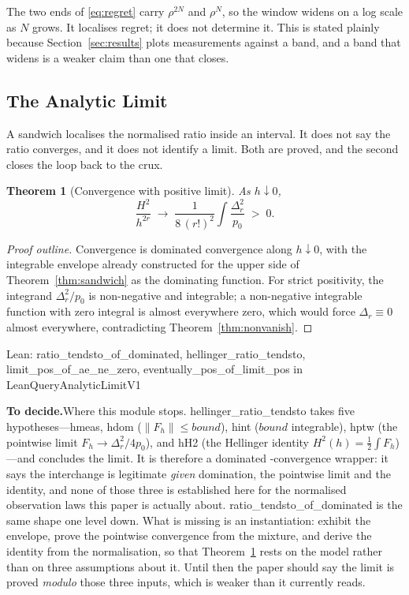\documentclass[conference]{IEEEtran}
\newtheorem{theorem}{Theorem}
\theoremstyle{definition}
\newcommand{\lean}[1]{\textsf{\footnotesize #1}}
\newcommand{\leanbox}[1]{%
  \par\vspace{2pt}\noindent
  {\footnotesize\textsf{Lean: #1}}\par\vspace{2pt}}
\newif\ifshownotes\shownotestrue
\newcommand{\TODOPAR}[1]{\ifshownotes\par\vspace{2pt}\noindent%
  {\color{todocol}\textsf{\footnotesize\textbf{To decide.}\;#1}}\par\vspace{2pt}\fi}
\begin{document}
The two ends of \eqref{eq:regret} carry $\rho^{2N}$ and $\rho^{N}$, so the window widens on a
log scale as $N$ grows. It localises regret; it does not determine it. This is stated plainly
because Section~\ref{sec:results} plots measurements against a band, and a band that widens
is a weaker claim than one that closes.

\subsection{The Analytic Limit}
\label{sec:limit}

A sandwich localises the normalised ratio inside an interval. It does not say the ratio
converges, and it does not identify a limit. Both are proved, and the second closes the loop
back to the crux.

\begin{theorem}[Convergence with positive limit]
\label{thm:limit}
As $h\downarrow0$,
\begin{equation}
\frac{H^{2}}{h^{2r}}\;\longrightarrow\;\frac{1}{8\,(r!)^{2}}\int\frac{\Delta_{r}^{2}}{p_{0}}
\;>\;0 .
\label{eq:limit}
\end{equation}
\end{theorem}

\begin{proof}[Proof outline]
Convergence is dominated convergence along $h\downarrow0$, with the integrable envelope
already constructed for the upper side of Theorem~\ref{thm:sandwich} as the dominating
function. For strict positivity, the integrand $\Delta_{r}^{2}/p_{0}$ is non-negative and
integrable; a non-negative integrable function with zero integral is almost everywhere zero,
which would force $\Delta_{r}\equiv0$ almost everywhere, contradicting
Theorem~\ref{thm:nonvanish}.
\end{proof}

\leanbox{\lean{ratio\_tendsto\_of\_dominated}, \lean{hellinger\_ratio\_tendsto},
\lean{limit\_pos\_of\_ae\_ne\_zero}, \lean{eventually\_pos\_of\_limit\_pos} in
\lean{LeanQueryAnalyticLimitV1}}
\TODOPAR{Where this module stops. \lean{hellinger\_ratio\_tendsto} takes five
hypotheses---\lean{hmeas}, \lean{hdom} ($\lVert F_{h}\rVert\le\mathit{bound}$), \lean{hint}
($\mathit{bound}$ integrable), \lean{hptw} (the pointwise limit
$F_{h}\to\Delta_{r}^{2}/4p_{0}$), and \lean{hH2} (the Hellinger identity
$H^{2}(h)=\tfrac12\int F_{h}$)---and concludes the limit. It is therefore a dominated
-convergence wrapper: it says the interchange is legitimate \emph{given} domination, the
pointwise limit and the identity, and none of those three is established here for the
normalised observation laws this paper is actually about. \lean{ratio\_tendsto\_of\_dominated}
is the same shape one level down. What is missing is an instantiation: exhibit the envelope,
prove the pointwise convergence from the mixture, and derive the identity from the
normalisation, so that Theorem~\ref{thm:limit} rests on the model rather than on three
assumptions about it. Until then the paper should say the limit is proved \emph{modulo} those
three inputs, which is weaker than it currently reads.}
\end{document}
